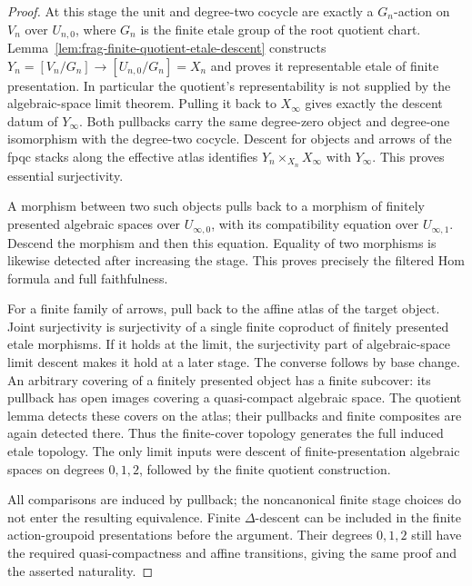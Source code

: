 \documentclass[11pt]{article}
\theoremstyle{definition}
\theoremstyle{remark}
\begin{document}
\begin{proof}
At this stage the unit and degree-two cocycle are exactly a
$G_n$-action on $V_n$ over $U_{n,0}$, where $G_n$ is the finite
etale group of the root quotient chart.  Lemma~\ref{lem:frag-finite-quotient-etale-descent}
constructs $Y_n=[V_n/G_n]\to[U_{n,0}/G_n]=X_n$ and proves it
representable etale of finite presentation.  In particular the
quotient's representability is not supplied by the algebraic-space
limit theorem.  Pulling it
back to $X_\infty$ gives exactly the descent datum of $Y_\infty$.
Both pullbacks carry the same degree-zero object and degree-one
isomorphism with the degree-two cocycle.  Descent for objects and
arrows of the fpqc stacks along the effective atlas identifies $Y_n\times_{X_n}X_\infty$ with $Y_\infty$.  This proves
essential surjectivity.

A morphism between two such objects pulls back to a morphism of
finitely presented algebraic spaces over $U_{\infty,0}$, with its
compatibility equation over $U_{\infty,1}$.  Descend the morphism
and then this equation.  Equality of two morphisms is likewise
detected after increasing the stage.  This proves precisely the
filtered Hom formula and full faithfulness.

For a finite family of arrows, pull back to the affine atlas of
the target object.  Joint surjectivity is surjectivity of a single
finite coproduct of finitely presented etale morphisms.  If it holds
at the limit, the surjectivity part of algebraic-space limit descent
makes it hold at a later stage.  The converse follows by base change.
An arbitrary covering of a finitely presented object has a finite
subcover: its pullback has open images covering a quasi-compact
algebraic space.  The quotient lemma detects these covers on the atlas; their
pullbacks and finite composites are again detected there.  Thus
the finite-cover topology generates the full induced etale topology.
The only limit inputs were descent of finite-presentation algebraic
spaces on degrees $0,1,2$, followed by the finite quotient construction.

All comparisons are induced by pullback; the noncanonical finite
stage choices do not enter the resulting equivalence.  Finite
$\Delta$-descent can be included in the finite action-groupoid
presentations before the argument.  Their degrees $0,1,2$ still
have the required quasi-compactness and affine transitions, giving
the same proof and the asserted naturality.
\end{proof}
\end{document}
